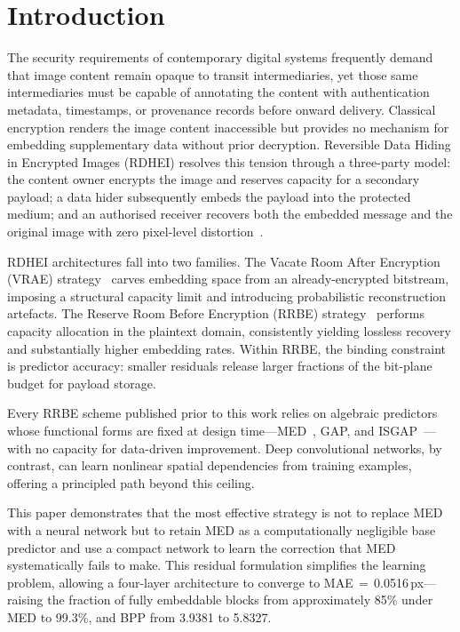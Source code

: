 \documentclass[runningheads]{llncs}
\begin{document}
\section{Introduction}
\label{sec:intro}

The security requirements of contemporary digital systems
frequently demand that image content remain opaque to transit
intermediaries, yet those same intermediaries must be capable
of annotating the content with authentication metadata,
timestamps, or provenance records before onward delivery.
Classical encryption renders the image content inaccessible
but provides no mechanism for embedding supplementary data
without prior decryption. Reversible Data Hiding in Encrypted
Images (RDHEI) resolves this tension through a three-party
model: the content owner encrypts the image and reserves
capacity for a secondary payload; a data hider subsequently
embeds the payload into the protected medium; and an
authorised receiver recovers both the embedded message and
the original image with zero pixel-level distortion~\cite{ref1,ref2}.

RDHEI architectures fall into two families. The Vacate Room
After Encryption (VRAE) strategy~\cite{ref1} carves embedding
space from an already-encrypted bitstream, imposing a
structural capacity limit and introducing probabilistic
reconstruction artefacts. The Reserve Room Before Encryption
(RRBE) strategy~\cite{ref2} performs capacity allocation in
the plaintext domain, consistently yielding lossless recovery
and substantially higher embedding rates. Within RRBE, the
binding constraint is predictor accuracy: smaller residuals
release larger fractions of the bit-plane budget for payload
storage.

Every RRBE scheme published prior to this work relies on
algebraic predictors whose functional forms are fixed at
design time---MED~\cite{ref3}, GAP, and
ISGAP~\cite{ref5}---with no capacity for data-driven
improvement. Deep convolutional networks, by contrast,
can learn nonlinear spatial dependencies from training
examples, offering a principled path beyond this ceiling.

This paper demonstrates that the most effective strategy is
not to replace MED with a neural network but to retain MED
as a computationally negligible base predictor and use a
compact network to learn the correction that MED
systematically fails to make. This residual formulation
simplifies the learning problem, allowing a four-layer
architecture to converge to MAE\,$=$\,0.0516\,px---raising
the fraction of fully embeddable blocks from approximately
85\% under MED to 99.3\%, and BPP from 3.9381 to 5.8327.
\end{document}
